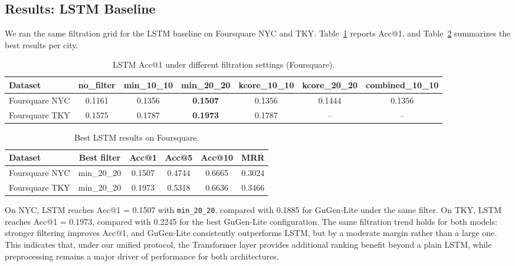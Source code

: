 \documentclass[12pt, journal]{IEEEtran}
\begin{document}
\subsection{Results: LSTM Baseline}

We ran the same filtration grid for the LSTM baseline on Foursquare NYC and TKY. Table~\ref{tab:lstm_acc1} reports Acc@1, and Table~\ref{tab:lstm_best} summarizes the best results per city.

\begin{table}[!t]
\centering
\caption{LSTM Acc@1 under different filtration settings (Foursquare).}
\label{tab:lstm_acc1}
\begin{tabular}{lcccccc}
\toprule
\textbf{Dataset} & \textbf{no\_filter} & \textbf{min\_10\_10} & \textbf{min\_20\_20} & \textbf{kcore\_10\_10} & \textbf{kcore\_20\_20} & \textbf{combined\_10\_10} \\
\midrule
Foursquare NYC & 0.1161 & 0.1356 & \textbf{0.1507} & 0.1356 & 0.1444 & 0.1356 \\
Foursquare TKY & 0.1575 & 0.1787 & \textbf{0.1973} & 0.1787 & -- & -- \\
\bottomrule
\end{tabular}
\end{table}

\begin{table}[!t]
\centering
\caption{Best LSTM results on Foursquare.}
\label{tab:lstm_best}
\begin{tabular}{lccccc}
\toprule
\textbf{Dataset} & \textbf{Best filter} & \textbf{Acc@1} & \textbf{Acc@5} & \textbf{Acc@10} & \textbf{MRR} \\
\midrule
Foursquare NYC & min\_20\_20 & 0.1507 & 0.4744 & 0.6665 & 0.3024 \\
Foursquare TKY & min\_20\_20 & 0.1973 & 0.5318 & 0.6636 & 0.3466 \\
\bottomrule
\end{tabular}
\end{table}

On NYC, LSTM reaches Acc@1 = 0.1507 with \texttt{min\_20\_20}, compared with 0.1885 for GuGen-Lite under the same filter. On TKY, LSTM reaches Acc@1 = 0.1973, compared with 0.2245 for the best GuGen-Lite configuration. The same filtration trend holds for both models: stronger filtering improves Acc@1, and GuGen-Lite consistently outperforms LSTM, but by a moderate margin rather than a large one. This indicates that, under our unified protocol, the Transformer layer provides additional ranking benefit beyond a plain LSTM, while preprocessing remains a major driver of performance for both architectures.
\end{document}
